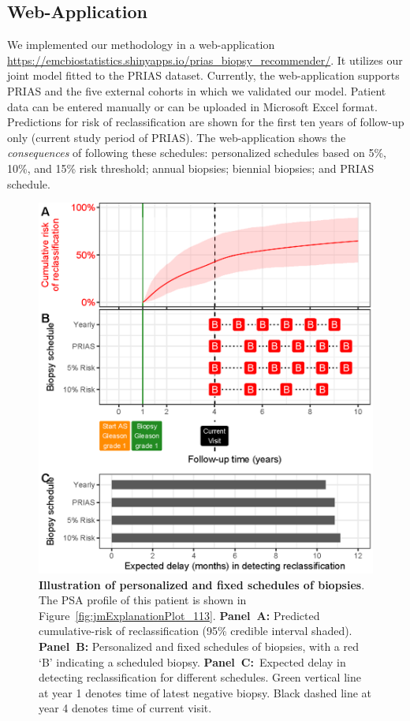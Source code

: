 \subsection{Web-Application}
We implemented our methodology in a web-application \url{https://emcbiostatistics.shinyapps.io/prias_biopsy_recommender/}. It utilizes our joint model fitted to the PRIAS dataset. Currently, the web-application supports PRIAS and the five external cohorts in which we validated our model. Patient data can be entered manually or can be uploaded in Microsoft Excel format. Predictions for risk of reclassification are shown for the first ten years of follow-up only (current study period of PRIAS). The web-application shows the \textit{consequences} of following these schedules: personalized schedules based on 5\%, 10\%, and 15\% risk threshold; annual biopsies; biennial biopsies; and PRIAS schedule.

\begin{figure}[!htb]
\centerline{\includegraphics[width=\columnwidth]{images/demo_pat1.eps}}
\caption{\textbf{Illustration of personalized and fixed schedules of biopsies}. The PSA profile of this patient is shown in Figure~\ref{fig:jmExplanationPlot_113}. \textbf{Panel~A:} Predicted cumulative-risk of reclassification (95\% credible interval shaded). \textbf{Panel~B:} Personalized and fixed schedules of biopsies, with a red `B' indicating a scheduled biopsy. \textbf{Panel~C:}\ Expected delay in detecting reclassification for different schedules. Green vertical line at year 1 denotes time of latest negative biopsy. Black dashed line at year 4 denotes time of current visit.}
\label{fig:demo_pat1}
\end{figure}